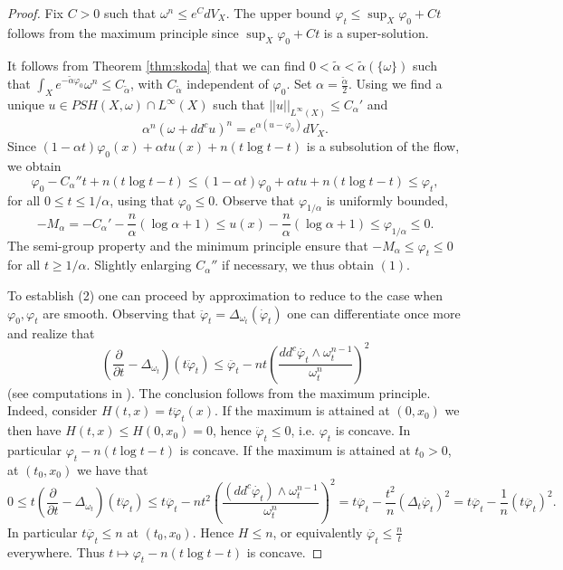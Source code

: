\documentclass[11pt]{amsart}
\numberwithin{equation}{section}
\newcommand{\f}{\varphi}
\begin{document}
\begin{proof}
Fix $C>0$ such that $\omega^n \leq e^C dV_X$.
The upper bound $\f_t \leq \sup_X \f_0+Ct$ follows  from the maximum principle since $\sup_X \f_0+Ct$ is a super-solution.

It follows from Theorem \ref{thm:skoda} that we can find $0 < \tilde{\alpha} < \tilde{\alpha}(\{\omega\})$ 
such that $\int_X e^{-\tilde{\alpha} \f_0} \omega^n \leq C_{\tilde{\alpha}}$, with
$C_{\tilde{\alpha}}$ independent of $\f_0$. Set $\alpha= \frac{\tilde{\alpha}}{2}$. Using \cite[Corollary 11.9 and Theorem 12.1]{GZbook} 
we find a unique $u \in PSH(X,\omega) \cap L^{\infty}(X)$ such that
$||u||_{L^{\infty}(X)} \leq C_{\alpha}'$ and
$$
\alpha^n (\omega+dd^c u)^n=e^{\alpha (u-\f_0)} dV_X.
$$
Since  $(1-\alpha t) \f_0(x)+\alpha t u(x) +n(t\log t-t)$ is a subsolution of the flow,
we obtain
\begin{equation}\label{C0 esti}
\f_0-C_{\alpha}''t  +n(t\log  t-t) \leq
(1-\alpha t) \f_0+\alpha t u +n(t\log  t-t) \leq \f_t,
\end{equation}
for all $0 \leq t \leq 1/\alpha$, using that $\f_0 \leq 0$. 
Observe that $\f_{1/\alpha}$ is uniformly bounded,
$$
-M_{\alpha}=-C_{\alpha}'-\frac{n}{\alpha}(\log \alpha +1) \leq
u(x)-\frac{n}{\alpha}(\log \alpha +1) \leq \f_{1/\alpha} \leq 0.
$$
The semi-group property and the minimum principle ensure that 
$-M_{\alpha} \leq \f_t \leq 0$ for all $t \geq 1/ \alpha$.
Slightly enlarging $C_{\alpha}''$ if necessary, we thus obtain $(1)$.

\smallskip

To establish (2) one can proceed by approximation to reduce to the case when $\f_0,\f_t$ are smooth.
Observing that $\ddot{\f}_t=\Delta_{\omega_t}(\dot{\f}_t)$ one can differentiate once more and realize that
$$
\left( \frac{\partial}{\partial t}-\Delta_{\omega_t} \right)(t \ddot{\f}_t) \leq \ddot{\f_t} - nt \left( \frac{dd^c \dot{\varphi_t} \wedge \omega_t^{n-1}}{\omega_t^n}\right)^2
$$
(see computations in \cite[Theorem 2.7]{GLZ20}). The conclusion follows from the maximum principle. Indeed, consider $H(t,x)=t \ddot{\f}_t(x)$. If the maximum is attained at $(0, x_0)$ we then have $H(t,x)\leq H(0, x_0)=0$, hence $ \ddot{\f}_t \leq 0$, i.e. $\f_t $ is concave. In particular $\f_t-n(t\log t -t)$ is concave. If the maximum is attained at $t_0>0$, at $(t_0, x_0)$ we have that $$0\leq t\left( \frac{\partial}{\partial t}-\Delta_{\omega_t} \right)(t \ddot{\f}_t) \leq t\ddot{\f_t} - nt^2 \left( \frac{(dd^c \dot{\varphi_t}) \wedge \omega_t^{n-1}}{\omega_t^n}\right)^2 = t\ddot{\f_t} -\frac{t^2}{n} (\Delta_t \dot{\f_t})^2=  t\ddot{\f_t} -\frac{1}{n} (t\ddot{\f_t})^2.$$
In particular $t\ddot{\f_t} \leq n$ at $(t_0, x_0)$. Hence $H\leq n$, or equivalently $\ddot{\f_t} \leq \frac{n}{t}$ everywhere. Thus $t \mapsto \varphi_t - n (t\log t-t)$ is concave.


\end{proof}
\end{document}
